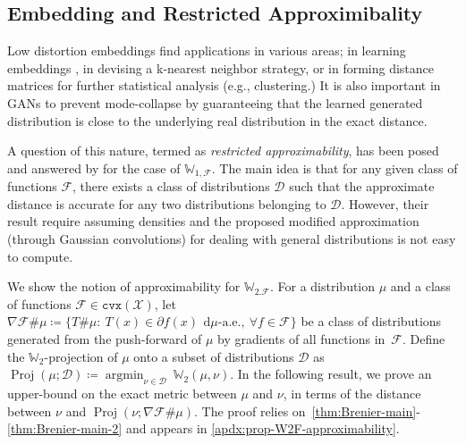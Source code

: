 \documentclass[10pt]{article}
\newcommand{\ud}{\,\mathrm{d}}
\newcommand{\cvx}{\mathtt{cvx}}
\newcommand{\argmin}{\mathop{\operatorname{argmin}}}
\newcommand{\W}{\mathds{W}}
\newcommand{\calD}{\mathcal{D}}
\newcommand{\calF}{\mathcal{F}}
\newcommand{\calX}{\mathcal{X}}
\numberwithin{equation}{section}
\begin{document}
\subsection{Embedding and Restricted Approximibality}\label{sec:app-ability}
Low distortion embeddings find applications in various areas; in learning embeddings \citep{courty2017learning}, in devising a k-nearest neighbor strategy, or in forming distance matrices for further statistical analysis (e.g., clustering.) It is also important in GANs to prevent mode-collapse by guaranteeing that the learned generated distribution is close to the underlying real distribution in the exact distance. 

A question of this nature, termed as {\em restricted approximability}, has been posed and answered by \citet{bai2018approximability} for the case of $\W_{1,\calF}$. The main idea is that for any given class of functions $\calF$, there exists a class of distributions $\calD$ such that the approximate distance is accurate for any two distributions belonging to $\calD$. However, their result require assuming densities and the proposed modified approximation (through Gaussian convolutions) for dealing with general distributions is not easy to compute. 

We show the notion of approximability for $\W_{2.\calF}$. For a distribution $\mu$ and a class of functions $\calF \in \cvx(\calX)$, let $\nabla \calF \#\mu \coloneqq \{T \# \mu:~T(x)\in \partial f(x)~\ud \mu\text{-a.e.},~\forall f \in \calF\}$ be a class of distributions generated from the push-forward of $\mu$ by gradients of all functions in~$\calF$. Define the $\W_2$-projection of $\mu$ onto a subset of distributions $\calD$ as $\operatorname{Proj}(\mu;\calD)\coloneqq \argmin_{\nu \in \calD}~\W_2(\mu,\nu)$. In the following result, we prove an upper-bound on the exact metric between $\mu$ and $\nu$, in terms of the distance between $\nu$ and $\operatorname{Proj}(\nu;\nabla \calF \# \mu)$. The proof relies on~\autoref{thm:Brenier-main}-\eqref{thm:Brenier-main-2} and appears in \autoref{apdx:prop-W2F-approximability}.
 
\end{document}
